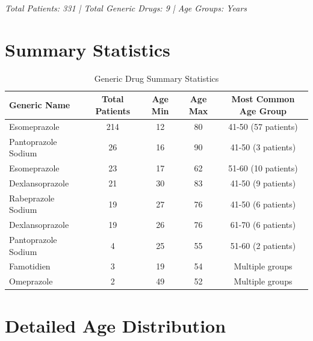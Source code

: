 \documentclass[10pt]{article}
\begin{document}
\vspace{1cm}

\textit{Total Patients: 331 | Total Generic Drugs: 9 | Age Groups: Years}

\section{Summary Statistics}

\begin{table}[h!]
\centering
\caption{Generic Drug Summary Statistics}
\label{tab:summary_stats}
\begin{tabular}{l|c|c|c|c}
\toprule
\rowcolor{headercolor}
\textbf{Generic Name} & \textbf{Total Patients} & \textbf{Age Min} & \textbf{Age Max} & \textbf{Most Common Age Group} \\
\midrule
Esomeprazole & 214 & 12 & 80 & 41-50 (57 patients) \\
\rowcolor{altrowcolor}
Pantoprazole Sodium & 26 & 16 & 90 & 41-50 (3 patients) \\
Esomeprazole & 23 & 17 & 62 & 51-60 (10 patients) \\
\rowcolor{altrowcolor}
Dexlansoprazole & 21 & 30 & 83 & 41-50 (9 patients) \\
Rabeprazole Sodium & 19 & 27 & 76 & 41-50 (6 patients) \\
\rowcolor{altrowcolor}
Dexlansoprazole & 19 & 26 & 76 & 61-70 (6 patients) \\
Pantoprazole Sodium & 4 & 25 & 55 & 51-60 (2 patients) \\
\rowcolor{altrowcolor}
Famotidien & 3 & 19 & 54 & Multiple groups \\
Omeprazole & 2 & 49 & 52 & Multiple groups \\
\bottomrule
\end{tabular}
\end{table}

\section{Detailed Age Distribution}
\end{document}
